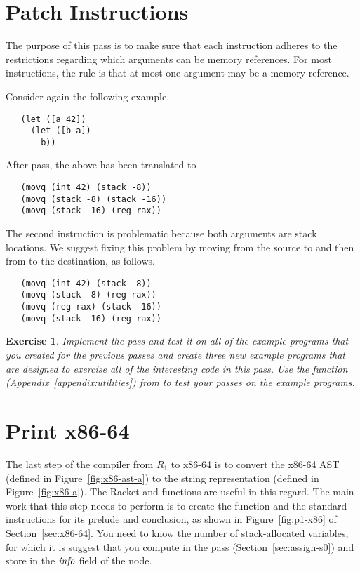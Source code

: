 \documentclass[11pt]{book}
\newtheorem{exercise}[theorem]{Exercise}
\begin{document}
\section{Patch Instructions}
\label{sec:patch-s0}

The purpose of this pass is to make sure that each instruction adheres
to the restrictions regarding which arguments can be memory
references. For most instructions, the rule is that at most one
argument may be a memory reference.

Consider again the following example.
\begin{lstlisting}
   (let ([a 42])
     (let ([b a])
       b))
\end{lstlisting}
After  pass, the above has been translated to
\begin{lstlisting}
   (movq (int 42) (stack -8))
   (movq (stack -8) (stack -16))
   (movq (stack -16) (reg rax))
\end{lstlisting}
The second  instruction is problematic because both arguments
are stack locations. We suggest fixing this problem by moving from the
source to  and then from  to the destination, as
follows.
\begin{lstlisting}
   (movq (int 42) (stack -8))
   (movq (stack -8) (reg rax))
   (movq (reg rax) (stack -16))
   (movq (stack -16) (reg rax))
\end{lstlisting}

\begin{exercise}
\normalfont
Implement the  pass and test it on all of the
example programs that you created for the previous passes and create
three new example programs that are designed to exercise all of the
interesting code in this pass. Use the  function
(Appendix~\ref{appendix:utilities}) from  to test
your passes on the example programs.
\end{exercise}


\section{Print x86-64}
\label{sec:print-x86}
The last step of the compiler from $R_1$ to x86-64 is to convert the
x86-64 AST (defined in Figure~\ref{fig:x86-ast-a}) to the string
representation (defined in Figure~\ref{fig:x86-a}). The Racket
 and  functions are useful in this
regard. The main work that this step needs to perform is to create the
 function and the standard instructions for its prelude
and conclusion, as shown in Figure~\ref{fig:p1-x86} of
Section~\ref{sec:x86-64}. You need to know the number of
stack-allocated variables, for which it is suggest that you compute in
the  pass (Section~\ref{sec:assign-s0}) and store in
the $\mathit{info}$ field of the  node.
\end{document}
